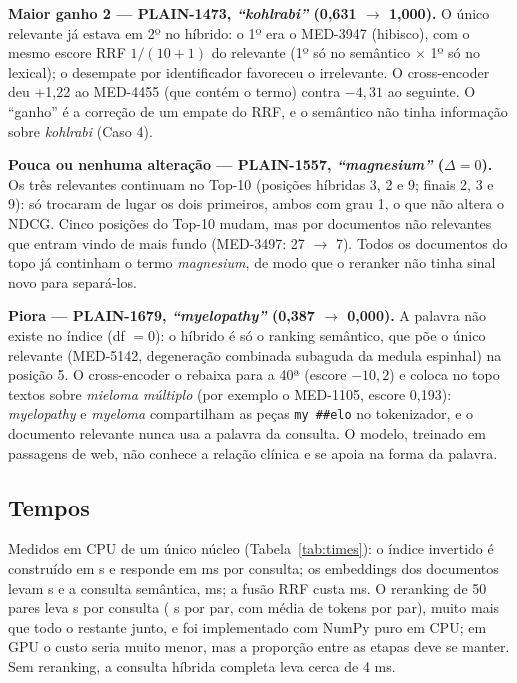 \textbf{Maior ganho 2 --- PLAIN-1473, \emph{``kohlrabi''} (0,631 $\rightarrow$ 1,000).} O único relevante já estava em 2º no híbrido: o 1º era o MED-3947 (hibisco), com o mesmo escore RRF $1/(10+1)$ do relevante (1º só no semântico $\times$ 1º só no lexical); o desempate por identificador favoreceu o irrelevante. O cross-encoder deu +1,22 ao MED-4455 (que contém o termo) contra $-4{,}31$ ao seguinte. O ``ganho'' é a correção de um empate do RRF, e o semântico não tinha informação sobre \emph{kohlrabi} (Caso 4).

\textbf{Pouca ou nenhuma alteração --- PLAIN-1557, \emph{``magnesium''} ($\Delta=0$).} Os três relevantes continuam no Top-10 (posições híbridas 3, 2 e 9; finais 2, 3 e 9): só trocaram de lugar os dois primeiros, ambos com grau 1, o que não altera o NDCG. Cinco posições do Top-10 mudam, mas por documentos não relevantes que entram vindo de mais fundo (MED-3497: 27 $\rightarrow$ 7). Todos os documentos do topo já continham o termo \emph{magnesium}, de modo que o reranker não tinha sinal novo para separá-los.

\textbf{Piora --- PLAIN-1679, \emph{``myelopathy''} (0,387 $\rightarrow$ 0,000).} A palavra não existe no índice (df $=0$): o híbrido é só o ranking semântico, que põe o único relevante (MED-5142, degeneração combinada subaguda da medula espinhal) na posição 5. O cross-encoder o rebaixa para a 40ª (escore $-10{,}2$) e coloca no topo textos sobre \emph{mieloma múltiplo} (por exemplo o MED-1105, escore 0,193): \emph{myelopathy} e \emph{myeloma} compartilham as peças \texttt{my\,\#\#elo} no tokenizador, e o documento relevante nunca usa a palavra da consulta. O modelo, treinado em passagens de web, não conhece a relação clínica e se apoia na forma da palavra.

\subsection{Tempos}

Medidos em CPU de um único núcleo (Tabela~\ref{tab:times}): o índice invertido é construído em \IdxTotal{} s e responde em \LexMs{} ms por consulta; os embeddings dos documentos levam \EncDocSeconds{} s e a consulta semântica, \EncQueryMs{} ms; a fusão RRF custa \RrfMs{} ms. O reranking de 50 pares leva \CEMsQuery{} s por consulta (\CESecPair{} s por par, com média de \CEPairTokens{} tokens por par), muito mais que todo o restante junto, e foi implementado com NumPy puro em CPU; em GPU o custo seria muito menor, mas a proporção entre as etapas deve se manter. Sem reranking, a consulta híbrida completa leva cerca de 4 ms.

